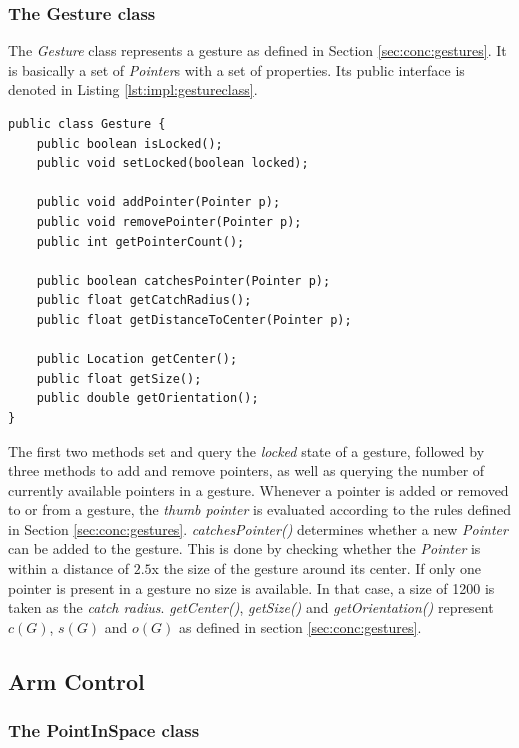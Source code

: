 \subsubsection{The Gesture class}

The \textit{Gesture} class represents a gesture as defined in Section \ref{sec:conc:gestures}. It is basically a set of \textit{Pointer}s with a set of properties. Its public interface is denoted in Listing \ref{lst:impl:gestureclass}.

\begin{lstlisting}[caption={Public interface of the Gesture class},label=lst:impl:gestureclass]
public class Gesture {
	public boolean isLocked();
	public void setLocked(boolean locked);
	
	public void addPointer(Pointer p);
	public void removePointer(Pointer p);
	public int getPointerCount();
	
	public boolean catchesPointer(Pointer p);
	public float getCatchRadius();
	public float getDistanceToCenter(Pointer p);
	
	public Location getCenter();
	public float getSize();
	public double getOrientation();
}
\end{lstlisting}

The first two methods set and query the \textit{locked} state of a gesture, followed by three methods to add and remove pointers, as well as querying the number of currently available pointers in a gesture. Whenever a pointer is added or removed to or from a gesture, the \textit{thumb pointer} is evaluated according to the rules defined in Section \ref{sec:conc:gestures}.
\textit{catchesPointer()} determines whether a new \textit{Pointer} can be added to the gesture. This is done by checking whether the \textit{Pointer}  is within a distance of $2.5$x the size of the gesture around its center. If only one pointer is present in a gesture no size is available. In that case, a size of 1200 is taken as the \textit{catch radius}. \textit{getCenter()}, \textit{getSize()} and \textit{getOrientation()} represent $c(G)$, $s(G)$ and $o(G)$ as defined in section \ref{sec:conc:gestures}.

\subsection{Arm Control}
\label{sec:impl:armcontrol}
\subsubsection{The PointInSpace class}

